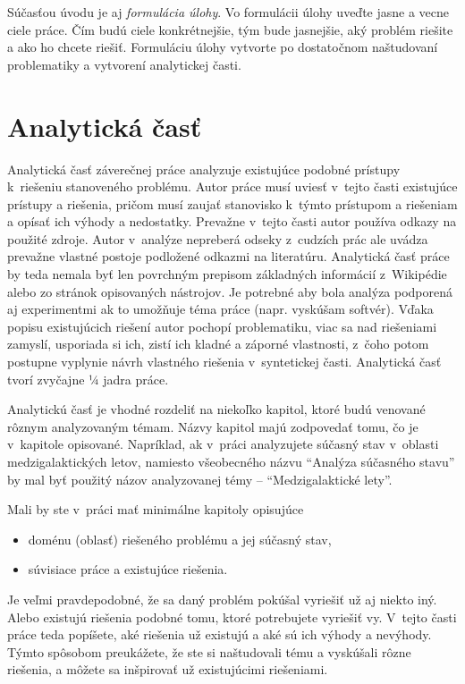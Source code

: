 Súčasťou úvodu je aj \emph{formulácia úlohy}.
Vo formulácii úlohy uveďte jasne a vecne ciele práce. Čím budú ciele konkrétnejšie, tým bude jasnejšie, aký problém riešite a ako ho chcete riešiť.
Formuláciu úlohy vytvorte po dostatočnom naštudovaní problematiky a vytvorení analytickej časti.


\section*{Analytická časť}

Analytická časť záverečnej práce analyzuje existujúce podobné prístupy k~riešeniu stanoveného problému. Autor práce musí uviesť v~tejto časti existujúce prístupy a riešenia, pričom musí zaujať stanovisko k~týmto prístupom a riešeniam a opísať ich výhody a nedostatky. Prevažne v~tejto časti autor používa odkazy na použité zdroje. Autor v~analýze nepreberá odseky z~cudzích prác ale uvádza prevažne vlastné postoje podložené odkazmi na literatúru. Analytická časť práce by teda nemala byť len povrchným prepisom základných informácií z~Wikipédie alebo zo stránok opisovaných nástrojov. Je potrebné aby bola analýza podporená aj experimentmi ak to umožňuje téma práce (napr. vyskúšam softvér). Vďaka popisu existujúcich riešení autor pochopí problematiku, viac sa nad riešeniami zamyslí, usporiada si ich, zistí ich kladné a záporné vlastnosti, z~čoho potom postupne vyplynie návrh vlastného riešenia v~syntetickej časti. Analytická časť tvorí zvyčajne ¼ jadra práce.

Analytickú časť je vhodné rozdeliť na niekoľko kapitol, ktoré budú venované rôznym analyzovaným témam. Názvy kapitol majú zodpovedať tomu, čo je v~kapitole opisované. Napríklad, ak v~práci analyzujete súčasný stav v~oblasti medzigalaktických letov, namiesto všeobecného názvu \enquote{Analýza súčasného stavu} by mal byť použitý názov analyzovanej témy -- \enquote{Medzigalaktické lety}.

Mali by ste v~práci mať minimálne kapitoly opisujúce
\begin{itemize}
  \item doménu (oblasť) riešeného problému a jej súčasný stav,
  \item súvisiace práce a existujúce riešenia.
\end{itemize}

Je veľmi pravdepodobné, že sa daný problém pokúšal vyriešiť už aj niekto iný. Alebo existujú riešenia podobné tomu, ktoré potrebujete vyriešiť vy. V~tejto časti práce teda popíšete, aké riešenia už existujú a aké sú ich výhody a nevýhody. Týmto spôsobom preukážete, že ste si naštudovali tému a vyskúšali rôzne riešenia, a môžete sa inšpirovať už existujúcimi riešeniami.


